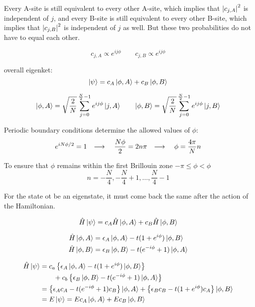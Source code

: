 \documentclass[10pt, a4paper, twocolumn]{article}
\newcommand{\arr}{\ensuremath{\longrightarrow\ }}
\begin{document}
Every A-site is still equivalent to every other A-site, which implies that $\abs{c_{j,A}}^2$ is independent of $j$, and every B-site is still equivalent to every other B-site, which implies that $\abs{c_{j,B}}^2$ is independent of $j$ as well. But these two probabilities do not have to equal each other.

\[c_{j,A} \propto e^{ij\phi} \qquad
c_{j,B} \propto e^{ij\phi} \]

overall eigenket:
\[\ket\psi =c_A \ket{\phi,A} + c_B\ket{\phi,B} \]

\[ \ket{\phi,A} =\sqrt{\frac{2}{N}}
\sum _{j=0}^{\frac{N}{2} -1} e^{ij\phi} \ket{j,A}
\qquad
\ket{\phi,B} =\sqrt{\frac{2}{N}}
\sum _{j=0}^{\frac{N}{2} -1} e^{ij\phi} \ket{j,B} \]

Periodic boundary conditions determine the allowed values of $\phi$:
\[ e^{iN\phi/2} =1 \qq{\arr} \frac{N\phi}{2} = 2n\pi
\qq{\arr} \phi = \frac{4\pi}{N}n \]

To ensure that $\phi$ remains within the first Brillouin zone $-\pi\leq\phi <\phi$
\[n = -\frac{N}{4},-\frac{N}{4}+1,\ldots ,\frac{N}{4} -1 \]

For the state ot be an eigenstate, it must come back the same after the action of the Hamiltonian.

\[\hat H\ket\psi = c_A\hat H\ket{\phi,A}
+ c_B\hat H\ket{\phi,B} \]

\begin{equation*}
\begin{aligned}
\hat H \ket{\phi, A} &= \epsilon _A \ket{\phi,A}
-t(1+e^{i\phi}) \ket{\phi, B}
\\ \hat H \ket{\phi, B} &= \epsilon _B \ket{\phi,B}
-t(e^{-i\phi}+1) \ket{\phi, A}
\end{aligned}
\end{equation*}

\begin{equation*}
\begin{aligned}
\hat H\ket\psi &=
c_a \left\{
\epsilon _A \ket{\phi,A} -t(1+e^{i\phi})\ket{\phi,B}
\right\}
\\ & \qquad + c_b \left\{
\epsilon _B \ket{\phi,B} -t(e^{-i\phi}+1)\ket{\phi,A}
\right\}
\\&=
\left\{ \epsilon _Ac_A-t(e^{-i\phi}+1)c_B \right\}
\ket{\phi,A}
+ \left\{ \epsilon _Bc_B-t(1+e^{i\phi})c_A \right\}
\ket{\phi,B}
\\&= E\ket\psi = Ec_A\ket{\phi,A} + Ec_B\ket{\phi,B}
\end{aligned}
\end{equation*}
\end{document}
